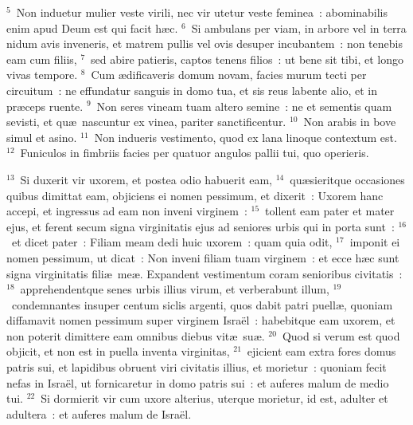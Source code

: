 ${}^{5}$~Non induetur mulier veste virili, nec vir utetur veste feminea~: abominabilis enim apud Deum est qui facit h\ae c.
${}^{6}$~Si ambulans per viam, in arbore vel in terra nidum avis inveneris, et matrem pullis vel ovis desuper incubantem~: non tenebis eam cum filiis,
${}^{7}$~sed abire patieris, captos tenens filios~: ut bene sit tibi, et longo vivas tempore.
${}^{8}$~Cum \ae dificaveris domum novam, facies murum tecti per circuitum~: ne effundatur sanguis in domo tua, et sis reus labente alio, et in pr\ae ceps ruente.
${}^{9}$~Non seres vineam tuam altero semine~: ne et sementis quam sevisti, et qu\ae\ nascuntur ex vinea, pariter sanctificentur.
${}^{10}$~Non arabis in bove simul et asino.
${}^{11}$~Non indueris vestimento, quod ex lana linoque contextum est.
${}^{12}$~Funiculos in fimbriis facies per quatuor angulos pallii tui, quo operieris.


${}^{13}$~Si duxerit vir uxorem, et postea odio habuerit eam,
${}^{14}$~qu\ae sieritque occasiones quibus dimittat eam, objiciens ei nomen pessimum, et dixerit~: Uxorem hanc accepi, et ingressus ad eam non inveni virginem~:
${}^{15}$~tollent eam pater et mater ejus, et ferent secum signa virginitatis ejus ad seniores urbis qui in porta sunt~:
${}^{16}$~et dicet pater~: Filiam meam dedi huic uxorem~: quam quia odit,
${}^{17}$~imponit ei nomen pessimum, ut dicat~: Non inveni filiam tuam virginem~: et ecce h\ae c sunt signa virginitatis fili\ae\ me\ae . Expandent vestimentum coram senioribus civitatis~:
${}^{18}$~apprehendentque senes urbis illius virum, et verberabunt illum,
${}^{19}$~condemnantes insuper centum siclis argenti, quos dabit patri puell\ae , quoniam diffamavit nomen pessimum super virginem Isra\"el~: habebitque eam uxorem, et non poterit dimittere eam omnibus diebus vit\ae\ su\ae .
${}^{20}$~Quod si verum est quod objicit, et non est in puella inventa virginitas,
${}^{21}$~ejicient eam extra fores domus patris sui, et lapidibus obruent viri civitatis illius, et morietur~: quoniam fecit nefas in Isra\"el, ut fornicaretur in domo patris sui~: et auferes malum de medio tui.
${}^{22}$~Si dormierit vir cum uxore alterius, uterque morietur, id est, adulter et adultera~: et auferes malum de Isra\"el.


